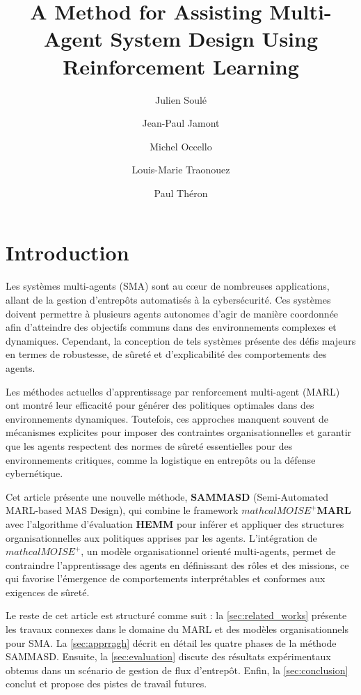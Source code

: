 \documentclass[sigconf,anonymous]{aamas}
\title[AAMAS-2025 CybMASDE]{A Method for Assisting Multi-Agent System Design Using Reinforcement Learning}
\author{Julien Soulé}
\affiliation{
  \institution{Univ. Grenoble Alpes}
  \city{Valence}
  \country{France}}
\author{Jean-Paul Jamont}
\affiliation{
  \institution{Univ. Grenoble Alpes}
  \city{Valence}
  \country{France}}
\author{Michel Occello}
\affiliation{
  \institution{Univ. Grenoble Alpes}
  \city{Valence}
  \country{France}}
\author{Louis-Marie Traonouez}
\affiliation{
  \institution{Thales Land and Air Systems, BU IAS}
  \city{Rennes}
  \country{France}}
\author{Paul Théron}
\affiliation{
  \institution{AICA IWG}
  \city{La Guillermie}
  \country{France}}
\begin{document}

\pagestyle{fancy}
\fancyhead{}


\maketitle


\section{Introduction}

Les systèmes multi-agents (SMA) sont au cœur de nombreuses applications, allant de la gestion d'entrepôts automatisés à la cybersécurité. Ces systèmes doivent permettre à plusieurs agents autonomes d'agir de manière coordonnée afin d'atteindre des objectifs communs dans des environnements complexes et dynamiques. Cependant, la conception de tels systèmes présente des défis majeurs en termes de robustesse, de sûreté et d'explicabilité des comportements des agents.

Les méthodes actuelles d'apprentissage par renforcement multi-agent (MARL) ont montré leur efficacité pour générer des politiques optimales dans des environnements dynamiques. Toutefois, ces approches manquent souvent de mécanismes explicites pour imposer des contraintes organisationnelles et garantir que les agents respectent des normes de sûreté essentielles pour des environnements critiques, comme la logistique en entrepôts ou la défense cybernétique.

Cet article présente une nouvelle méthode, \textbf{SAMMASD} (Semi-Automated MARL-based MAS Design), qui combine le framework \textbf{$mathcal{M}OISE^+$MARL} avec l'algorithme d'évaluation \textbf{HEMM} pour inférer et appliquer des structures organisationnelles aux politiques apprises par les agents. L'intégration de \textbf{$mathcal{M}OISE^+$}, un modèle organisationnel orienté multi-agents, permet de contraindre l'apprentissage des agents en définissant des rôles et des missions, ce qui favorise l'émergence de comportements interprétables et conformes aux exigences de sûreté.

Le reste de cet article est structuré comme suit : la \autoref{sec:related_works} présente les travaux connexes dans le domaine du MARL et des modèles organisationnels pour SMA. La \autoref{sec:apprragh} décrit en détail les quatre phases de la méthode SAMMASD. Ensuite, la \autoref{sec:evaluation} discute des résultats expérimentaux obtenus dans un scénario de gestion de flux d'entrepôt. Enfin, la \autoref{sec:conclusion} conclut et propose des pistes de travail futures.
\end{document}

